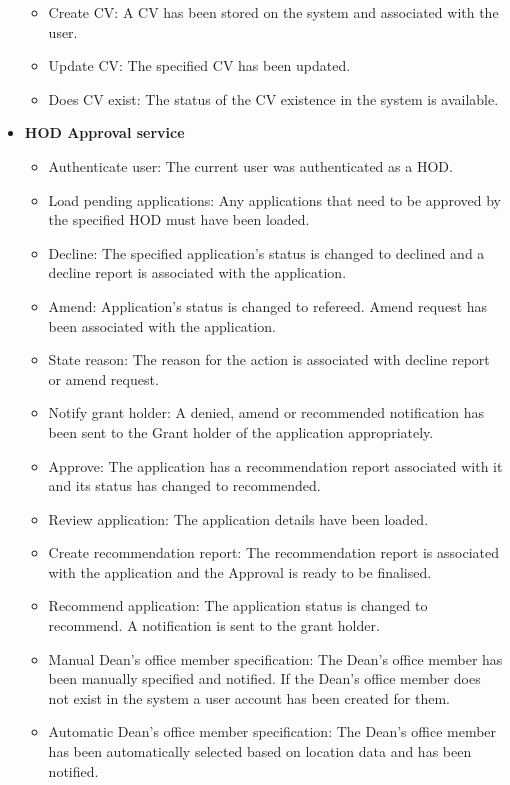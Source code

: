 \documentclass[12pt]{article}
\begin{document}
\begin{itemize}
\begin{itemize}
				\item Create CV: A CV has been stored on the system and associated with the user.
				\item Update CV: The specified CV has been updated.			
				\item Does CV exist: The status of the CV existence in the system is available.									
			\end{itemize}		
	\item \textbf{HOD Approval service}
		\begin{itemize}
			\item Authenticate user: The current user was authenticated as a HOD.
			\item Load pending applications: Any applications that need to be approved by the specified HOD must have been loaded.
			\item Decline: The specified application's status is changed to declined and a decline report is associated with the application.
			\item Amend: Application's status is changed to refereed. Amend request has been associated with the application.
			\item State reason: The reason for the action is associated with decline report or amend request. 
			\item Notify grant holder: A denied, amend or recommended notification has been sent to the Grant holder of the application appropriately.  
			\item Approve: The application has a recommendation report associated with it and its status has changed to recommended.
			\item Review application: The application details have been loaded.
			\item Create recommendation report: The recommendation report is associated with the application and the Approval is ready to be finalised.				
			\item Recommend application: The application status is changed to recommend. A notification is sent to the grant holder.
			\item Manual Dean's office member specification: The Dean's office member has been manually specified and notified. If the Dean's office member does not exist in the system a user account has been created for them.
			\item Automatic Dean's office member specification: The Dean's office member has been automatically selected based on location data and has been notified.									
		\end{itemize}
		

\end{itemize}
\end{document}
